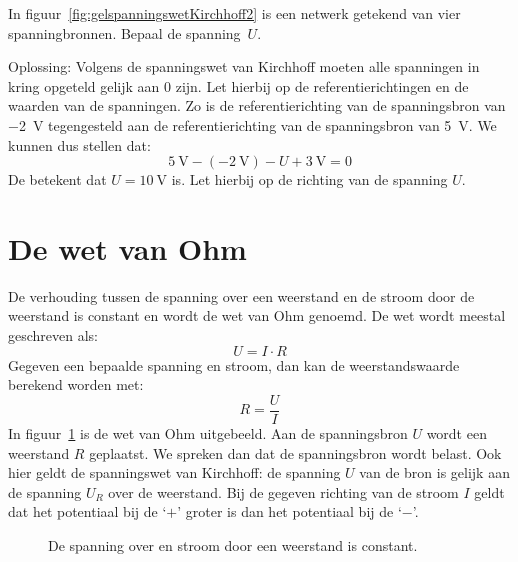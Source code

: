 \begin{example}
In figuur~\ref{fig:gelspanningswetKirchhoff2} is een netwerk getekend van vier spanningbronnen.
Bepaal de spanning~$U$.
\begin{center}
\centering
{}
\label{fig:gelspanningswetKirchhoff2}
\end{center}
Oplossing: Volgens de spanningswet van Kirchhoff moeten alle spanningen in kring opgeteld gelijk aan 0 zijn.
Let hierbij op de referentierichtingen en de waarden van de spanningen. Zo is de referentierichting van
de spanningsbron van \SI{-2}{\volt} tegengesteld aan de referentierichting van de spanningsbron van
\SI{5}{\volt}. We kunnen dus stellen dat:
\begin{equation}
\SI{5}{\volt} - (\SI{-2}{\volt}) - U + \SI{3}{\volt} = 0
\end{equation}
De betekent dat $U = \SI{10}{\volt}$ is. Let hierbij op de richting van de spanning $U$.
\end{example}


\section{De wet van Ohm}
De verhouding tussen de spanning over een weerstand en de stroom door de weerstand is constant
en wordt de wet van Ohm genoemd. De wet wordt meestal geschreven als:
\begin{equation}
U=I\cdot R
\end{equation}
%
Gegeven een bepaalde spanning en stroom, dan kan de weerstandswaarde berekend worden met:
%
\begin{equation}
R = \dfrac{U}{I}
\end{equation}
%
In figuur~\ref{fig:geldewetvanohm} is de wet van Ohm uitgebeeld. Aan de spanningsbron $U$ wordt
een weerstand $R$ geplaatst. We spreken dan dat de spanningsbron wordt belast. Ook hier geldt de
spanningswet van Kirchhoff: de spanning $U$ van de bron is gelijk aan de spanning $U_R$ over de
weerstand. Bij de gegeven richting van de stroom $I$ geldt dat het potentiaal bij de `$+$' groter
is dan het potentiaal bij de `$-$'.

\begin{figure}[!ht]
\centering
{}
\caption{De spanning over en stroom door een weerstand is constant.}
\label{fig:geldewetvanohm}
\end{figure}


